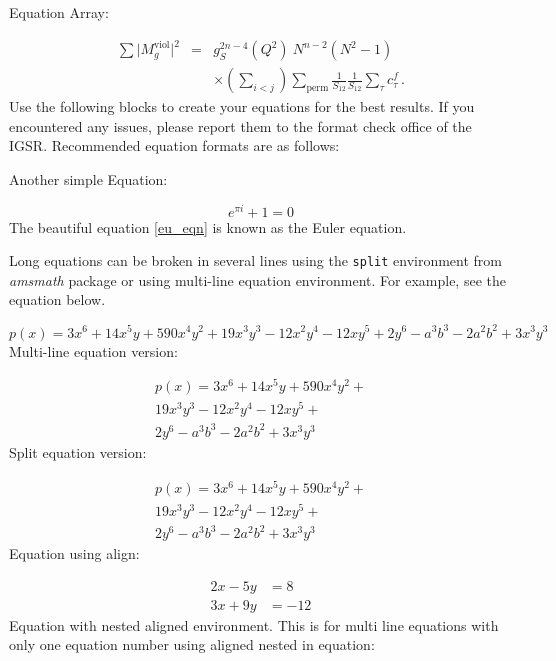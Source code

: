 \documentclass[a4paper,12pt,oneside]{report}
\begin{document}
Equation Array:

\begin{eqnarray}
  \sum \vert M^{\text{viol}}_g \vert ^2
   &=&  g^{2n-4}_S(Q^2)~N^{n-2} (N^2-1)
\nonumber
\\
   &&   \times \left( \sum_{i<j}\right) \sum_{\text{perm}}
            \frac{1}{S_{12}}  \frac{1}{S_{12}} \sum_\tau c^f_\tau
\,.
\label{eq:multilineeq}
\end{eqnarray}
Use the following blocks to create your equations for the best results. If you encountered any issues, please report them to the format check office of the IGSR. Recommended equation formats are as follows: \noskip

Another simple Equation:

\begin{equation} \label{eu_eqn}
  e^{\pi i} + 1 = 0
\end{equation}
The beautiful equation \eqref{eu_eqn} is known as the Euler equation.

Long equations can be broken in several lines using the \texttt{split} environment from \textit{amsmath} package or using multi-line equation environment. For example, see the equation below.

\begin{equation} 
p(x) = 3x^6 + 14x^5y + 590x^4y^2 + 19x^3y^3 - 12x^2y^4 - 12xy^5 + 2y^6 - a^3b^3 - 2a^2b^2 + 3x^3y^3
\end{equation} 
Multi-line equation version:

\begin{multline}
p(x) = 3x^6 + 14x^5y + 590x^4y^2 + \\
  19x^3y^3 - 12x^2y^4 - 12xy^5 + \\
  2y^6 - a^3b^3 - 2a^2b^2 + 3x^3y^3
\end{multline}
Split equation version:

\begin{equation}
\begin{split}
p(x) = 3x^6 + 14x^5y + 590x^4y^2 + \\
19x^3y^3 - 12x^2y^4 - 12xy^5 + \\
2y^6 - a^3b^3 - 2a^2b^2 + 3x^3y^3
\end{split}
\end{equation}
Equation using align:

\begin{align*} 
2x - 5y &=  8 \\ 
3x + 9y &=  -12
\end{align*}
Equation with nested aligned environment. This is for multi line equations with only one equation number using aligned nested in equation:
\end{document}
